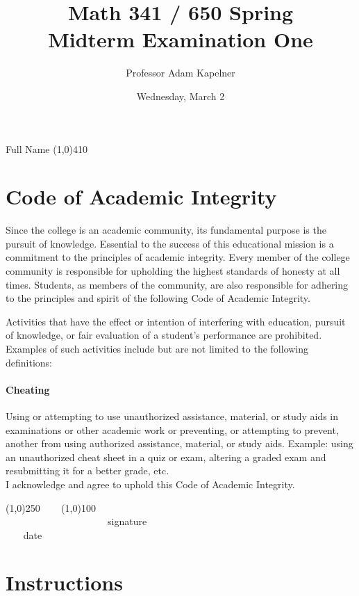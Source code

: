 \documentclass[12pt]{article}
\title{Math 341 / 650 Spring \the\year \\ Midterm Examination One}
\author{Professor Adam Kapelner}
\date{Wednesday, March 2}
\begin{document}
\maketitle

\noindent Full Name \line(1,0){410}

\thispagestyle{empty}

\section*{Code of Academic Integrity}

\footnotesize
Since the college is an academic community, its fundamental purpose is the pursuit of knowledge. Essential to the success of this educational mission is a commitment to the principles of academic integrity. Every member of the college community is responsible for upholding the highest standards of honesty at all times. Students, as members of the community, are also responsible for adhering to the principles and spirit of the following Code of Academic Integrity.

Activities that have the effect or intention of interfering with education, pursuit of knowledge, or fair evaluation of a student's performance are prohibited. Examples of such activities include but are not limited to the following definitions:

\paragraph{Cheating} Using or attempting to use unauthorized assistance, material, or study aids in examinations or other academic work or preventing, or attempting to prevent, another from using authorized assistance, material, or study aids. Example: using an unauthorized cheat sheet in a quiz or exam, altering a graded exam and resubmitting it for a better grade, etc.
\\

\noindent I acknowledge and agree to uphold this Code of Academic Integrity. \\

\begin{center}
\line(1,0){250} ~~~ \line(1,0){100}\\
~~~~~~~~~~~~~~~~~~~~~signature~~~~~~~~~~~~~~~~~~~~~~~~~~~~~~~~~~~~~~~~~~~~~ date
\end{center}

\normalsize

\section*{Instructions}
\end{document}
